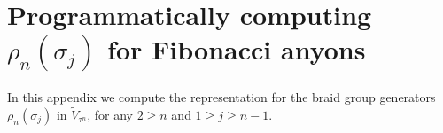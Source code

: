 \documentclass[a4paper,10pt,oneside]{book}
\theoremstyle{plain}
\theoremstyle{definition}
\theoremstyle{remark}
\begin{document}





\appendix


\chapter{Programmatically computing \texorpdfstring{$\rho_n(\sigma_j)$}{ρₙ(σⱼ)} for Fibonacci anyons}\label{sec:code}

In this appendix we compute the representation for the braid group generators $ρ_n(σ_j)$ in $\widetilde{V}_{τ^n}$, for any $2 \ge n$ and $1 \ge j \ge n-1$.
\end{document}

